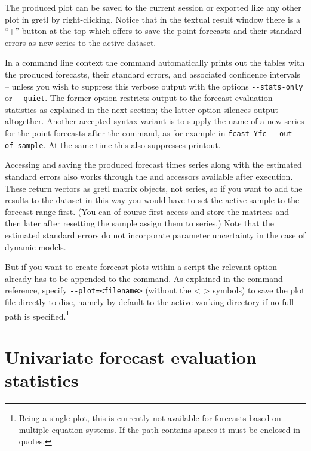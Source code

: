The produced plot can be saved to the current session or exported like
any other plot in gretl by right-clicking. Notice that in the textual
result window there is a ``+'' button at the top which offers to save
the point forecasts and their standard errors as new series to the
active dataset. 

In a command line context the  command automatically prints 
out the tables with the produced forecasts, their standard errors, and 
associated confidence intervals -- unless you wish to suppress this 
verbose output with the options \verb|--stats-only| or \verb|--quiet|. 
The former option restricts output to the forecast evaluation statistics
as explained in the next section; the latter option silences output 
altogether. Another accepted syntax variant is to supply the name of a
new series for the point forecasts after the  command, as for
example in \verb|fcast Yfc --out-of-sample|. At the same time this also
suppresses printout. 

Accessing and saving the produced forecast times series along with the 
estimated standard errors also works through 
the  and  accessors available after 
 execution. These return vectors as gretl matrix objects, not
series, so if you want to add the results to the dataset in this way you
would have to set the active sample to the forecast range first. (You 
can of course first access and store the matrices and then later after 
resetting the sample assign them to series.) Note that the estimated 
standard errors do not incorporate parameter uncertainty in the case
of dynamic models.

But if you want to create forecast plots within a
script the relevant option already has to be appended to the 
command. As explained in the 
command reference, specify \verb|--plot=<filename>| (without the < > 
symbols) to save the plot file directly to disc, namely by default to 
the active working directory if no full path is specified.\footnote{%
Being a single plot, this is currently not available
for forecasts based on multiple equation systems. If the path contains
spaces it must be enclosed in quotes.} 

\section{Univariate forecast evaluation statistics}
\label{sec:fcast-stats}

